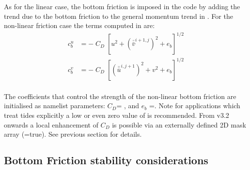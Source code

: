 As for the linear case, the bottom friction is imposed in the code by 
adding the trend due to the bottom friction to the general momentum trend 
in .
For the non-linear friction case the terms
computed in   are: 
\begin{equation} \label{Eq_zdfbfr_nonlinbfr}
\begin{split}
 c_b^u &= - \; C_D\;\left[ u^2 + \left(\bar{\bar{v}}^{i+1,j}\right)^2 + e_b \right]^{1/2}\\
 c_b^v &= - \; C_D\;\left[  \left(\bar{\bar{u}}^{i,j+1}\right)^2 + v^2 + e_b \right]^{1/2}\\
\end{split}
\end{equation}

The coefficients that control the strength of the non-linear bottom friction are 
initialised as namelist parameters: $C_D$= , and $e_b$ =. 
Note for applications which treat tides explicitly a low or even zero value of 
 is recommended. From v3.2 onwards a local enhancement of $C_D$ 
is possible via an externally defined 2D mask array (=true). 
See previous section for details.

\subsection{Bottom Friction stability considerations}
\label{ZDF_bfr_stability}

